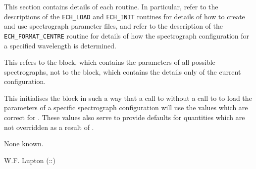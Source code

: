 This section contains details of each routine. In particular, refer to the
descriptions of the {\tt ECH\_LOAD} and {\tt ECH\_INIT} routines for details of
how to create and use spectrograph parameter files, and refer to the
description of the {\tt ECH\_FORMAT\_CENTRE} routine for details of how the
spectrograph configuration for a specified wavelength is determined.

\begin{manroutinedescription}
     This refers to the {} {} block, which %
contains the parameters
     of all possible spectrographs, not to the {} {} block, which
     contains the details only of the current configuration.

     This {} {} initialises the {} %
block in such a way that a call
     to {} without a call to {} to load the %
parameters of a
     specific spectrograph configuration will use the values which are correct
     for {}. These values also serve to provide defaults for %
quantities
     which are not overridden as a result of {}.

     None known.

     W.F. Lupton  {}  ({}::{})

\end{manroutinedescription}

